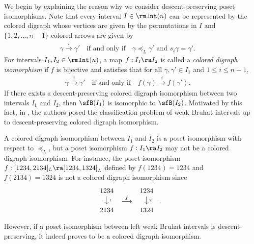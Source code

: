 \documentclass[12pt, reqno]{amsart}
\theoremstyle{definition}
\numberwithin{equation}{section} \numberwithin{figure}{section}
\numberwithin{table}{section}
\begin{document}
We begin by 
explaining the reason why we consider descent-preserving poset isomorphisms.
Note that every interval $I \in \rmInt(n)$ can be represented by the colored digraph whose vertices are given by the permutations in $I$ and $\{1,2,\ldots, n-1\}$-colored arrows are given by
\begin{align*}
\gamma \overset{i}{\rightarrow} \gamma' 
\quad \text{if and only if} \quad
\text{$\gamma \preceq_L \gamma'$ and $s_i \gamma = \gamma'$}. 
\end{align*}
For intervals $I_1, I_2 \in \rmInt(n)$, 
a map $f: I_1 \ra I_2$ is called a \emph{colored digraph isomorphism} if $f$ is bijective and satisfies that for all $\gamma, \gamma' \in I_1$ and $1 \leq i \leq n-1$, 
\begin{align*}
\gamma \overset{i}{\rightarrow} \gamma' 
\quad \text{if and only if} \quad
f(\gamma) \overset{i}{\rightarrow} f(\gamma').
\end{align*}
If there exists a descent-preserving colored digraph isomorphism between two intervals $I_1$ and $I_2$, then $\sfB(I_1)$ is isomorphic to $\sfB(I_2)$.
Motivated by this fact, in \cite[Subsection 3.1]{22JKLO}, the authors posed the classification problem of weak Bruhat intervals up to descent-preserving colored digraph isomorphism.


A colored digraph isomorphism between  $I_1$ and $I_2$ is  a poset isomorphism with respect to $\preceq_L$, but a poset isomorphism $f: I_1 \ra I_2$  may not be a colored digraph isomorphism.
For instance, the poset isomorphism $f: [1234, 2134]_L \ra [1234, 1324]_L$ 
defined by $f(1234) = 1234$ and $f(2134) = 1324$ is not a colored digraph isomorphism since
\[ 
\begin{array}{l}
\begin{tikzpicture}
\node[] at (0,1) {1234};
\node[] at (0.2,0.5) {\tiny 1};
\draw[->] (0,.7) -- (0,.3);
\node[] at (0,0) {2134};
\end{tikzpicture}
\end{array}
\overset{f}{\longrightarrow} 
\begin{array}{l}
\begin{tikzpicture}
\node[] at (0,1) {1234};
\node[] at (0.2,0.5) {\tiny 2};
\draw[->] (0,.7) -- (0,.3);
\node[] at (0,0) {1324};
\end{tikzpicture}
\end{array}.
\]
However, if a poset isomorphism between left weak Bruhat intervals is descent-preserving,
it indeed proves to be a colored digraph isomorphism.
\end{document}
